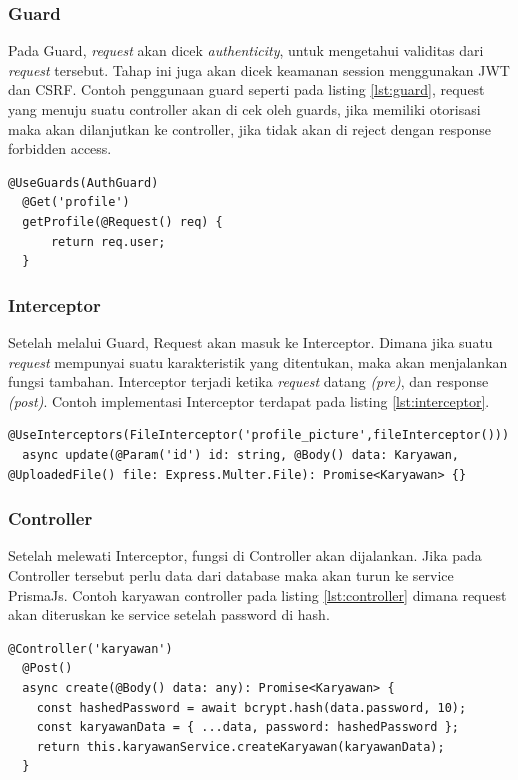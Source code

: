 \subsubsection{Guard}
Pada Guard, \textit{request} akan dicek \textit{authenticity}, untuk mengetahui validitas dari \textit{request} tersebut. Tahap ini juga akan dicek keamanan session menggunakan JWT dan CSRF. Contoh penggunaan guard seperti pada listing \ref{lst:guard}, request yang menuju suatu controller akan di cek oleh guards, jika memiliki otorisasi maka akan dilanjutkan ke controller, jika tidak akan di reject dengan response forbidden access.
\begin{lstlisting}[caption={Penggunaan Guards pada Controller},label={lst:guard}]
  @UseGuards(AuthGuard)
  @Get('profile')
  getProfile(@Request() req) {
      return req.user;
  }
\end{lstlisting}


\subsubsection{Interceptor}
Setelah melalui Guard, Request akan masuk ke Interceptor. Dimana jika suatu \textit{request} mempunyai suatu karakteristik yang ditentukan, maka akan menjalankan fungsi tambahan. Interceptor terjadi ketika \textit{request} datang \textit{(pre)}, dan response \textit{(post)}. Contoh implementasi Interceptor terdapat pada listing \ref{lst:interceptor}.
\begin{lstlisting}[caption={Interceptor},label={lst:interceptor}]
  @UseInterceptors(FileInterceptor('profile_picture',fileInterceptor()))
  async update(@Param('id') id: string, @Body() data: Karyawan, @UploadedFile() file: Express.Multer.File): Promise<Karyawan> {}
\end{lstlisting}

\subsubsection{Controller}
Setelah melewati Interceptor, fungsi di Controller akan dijalankan. Jika pada Controller tersebut perlu data dari database maka akan turun ke service PrismaJs. Contoh karyawan controller pada listing \ref{lst:controller} dimana request akan diteruskan ke service setelah password di hash.
\begin{lstlisting}[caption={Controller},label={lst:controller}]
  @Controller('karyawan')
  @Post()
  async create(@Body() data: any): Promise<Karyawan> {
    const hashedPassword = await bcrypt.hash(data.password, 10);
    const karyawanData = { ...data, password: hashedPassword };
    return this.karyawanService.createKaryawan(karyawanData);
  }
\end{lstlisting}

